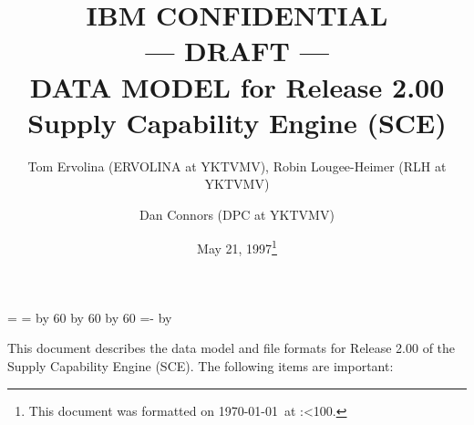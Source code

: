 \topmargin 0.0in
\headheight 0.0in
\headsep 0.0in
\textwidth 7.5in
\oddsidemargin -0.5in
\textheight 9in
\newcount\hh
\newcount\mm

\mm=\time
\hh=\time
\divide\hh by 60
\divide\mm by 60
\multiply\mm by 60
\mm=-\mm
\advance\mm by \time
\def\hhmm{\number\hh:\ifnum\mm<10{}0\fi\number\mm}


\title{IBM CONFIDENTIAL \\--- DRAFT --- \\ DATA MODEL for Release 2.00  Supply Capability Engine (SCE)}
\author{Tom Ervolina (ERVOLINA at YKTVMV), 
Robin Lougee-Heimer (RLH at YKTVMV) \and Dan Connors  (DPC at YKTVMV)}
\date{May 21, 1997\footnote[2]{This document was 
formatted on \today\ at \hhmm.}}
\maketitle
This document describes the data model and file formats 
for Release 2.00 of the Supply Capability 
Engine (SCE).  The following items are important:
